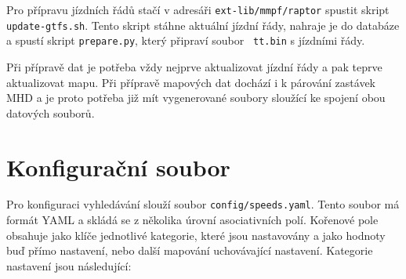 Pro přípravu jízdních řádů stačí v adresáři {\tt ext-lib/mmpf/raptor} spustit
skript {\tt update-gtfs.sh}. Tento skript stáhne aktuální jízdní řády, nahraje
je do databáze a spustí skript {\tt prepare.py}, který připraví soubor {\tt
tt.bin} s jízdními řády. 

Při přípravě dat je potřeba vždy nejprve aktualizovat jízdní řády a pak teprve
aktualizovat mapu. Při přípravě mapových dat dochází i k párování zastávek MHD a
je proto potřeba již mít vygenerované soubory sloužící ke spojení obou datových
souborů.

\section{Konfigurační soubor}
Pro konfiguraci vyhledávání slouží soubor {\tt config/speeds.yaml}. Tento soubor
má formát YAML a skládá se z několika úrovní asociativních polí. Kořenové pole
obsahuje jako klíče jednotlivé kategorie, které jsou nastavovány a jako hodnoty
buď přímo nastavení, nebo další mapování uchovávající nastavení. Kategorie
nastavení jsou následující:
